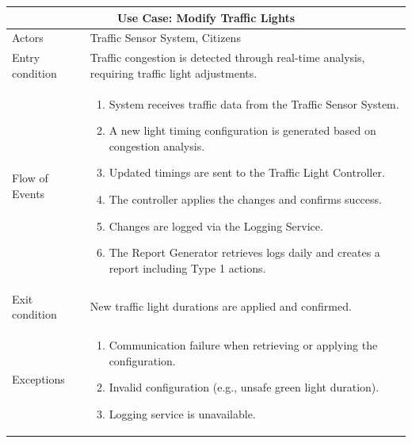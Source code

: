 \documentclass[11.5pt]{article}
\begin{document}
    \begin{table}[!htp]
        \centering
        \begin{tabular}{@{} l p{23em} @{}}
            \toprule \multicolumn{2}{c}{Use Case: \textbf{Modify Traffic Lights}} \\
            \midrule                                                                          %
            Actors                                                                           &  Traffic Sensor System, Citizens \\
            Entry condition                                                                  &  Traffic congestion is detected through real-time analysis, requiring traffic light adjustments.\\
            Flow of Events                                                                   & \begin{enumerate}[left=0pt, parsep=0pt, topsep=0pt]
            \item System receives traffic data from the Traffic Sensor System.
            \item A new light timing configuration is generated based on congestion analysis.
            \item Updated timings are sent to the Traffic Light Controller.
            \item The controller applies the changes and confirms success.
            \item Changes are logged via the Logging Service.
            \item The Report Generator retrieves logs daily and creates a report including Type 1 actions.
            \end{enumerate} \\
            Exit condition                                                                   &  New traffic light durations are applied and confirmed. \\
            Exceptions                                                                       &  \begin{enumerate}[left=0pt, parsep=0pt, topsep=0pt]
            \item Communication failure when retrieving or applying the configuration.
            \item Invalid configuration (e.g., unsafe green light duration).
            \item Logging service is unavailable.

\end{enumerate}
\end{tabular}
\end{table}
\end{document}
